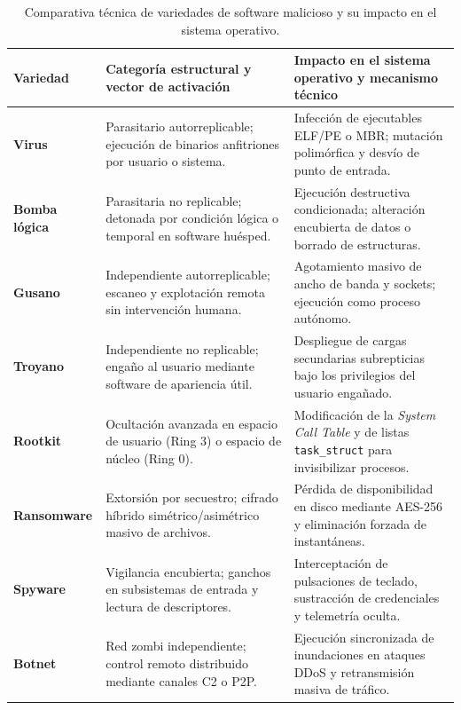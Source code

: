 \documentclass[12pt]{article}
\begin{document}
\begin{table}[!htbp]
\centering
\scriptsize
\renewcommand{\arraystretch}{1.05}
\renewcommand{\tabularxcolumn}[1]{m{#1}}
\setlength{\emergencystretch}{1.5em}
\caption{Comparativa técnica de variedades de software malicioso y su impacto en el sistema operativo.}
\label{tab:comparativaVariedadesMalware}
\begin{tabularx}{\textwidth}{>{\centering\arraybackslash}m{2.2cm} X X}
\toprule
\textbf{Variedad} & \textbf{Categoría estructural y vector de activación} & \textbf{Impacto en el sistema operativo y mecanismo técnico} \\
\midrule
\textbf{Virus} & Parasitario autorreplicable; ejecución de binarios anfitriones por usuario o sistema. & Infección de ejecutables ELF/PE o MBR; mutación polimórfica y desvío de punto de entrada. \\
\addlinespace
\textbf{Bomba lógica} & Parasitaria no replicable; detonada por condición lógica o temporal en software huésped. & Ejecución destructiva condicionada; alteración encubierta de datos o borrado de estructuras. \\
\addlinespace
\textbf{Gusano} & Independiente autorreplicable; escaneo y explotación remota sin intervención humana. & Agotamiento masivo de ancho de banda y sockets; ejecución como proceso autónomo. \\
\addlinespace
\textbf{Troyano} & Independiente no replicable; engaño al usuario mediante software de apariencia útil. & Despliegue de cargas secundarias subrepticias bajo los privilegios del usuario engañado. \\
\addlinespace
\textbf{Rootkit} & Ocultación avanzada en espacio de usuario (Ring 3) o espacio de núcleo (Ring 0). & Modificación de la \textit{System Call Table} y de listas \texttt{task\_struct} para invisibilizar procesos. \\
\addlinespace
\textbf{Ransomware} & Extorsión por secuestro; cifrado híbrido simétrico/asimétrico masivo de archivos. & Pérdida de disponibilidad en disco mediante AES-256 y eliminación forzada de instantáneas. \\
\addlinespace
\textbf{Spyware} & Vigilancia encubierta; ganchos en subsistemas de entrada y lectura de descriptores. & Interceptación de pulsaciones de teclado, sustracción de credenciales y telemetría oculta. \\
\addlinespace
\textbf{Botnet} & Red zombi independiente; control remoto distribuido mediante canales C2 o P2P. & Ejecución sincronizada de inundaciones en ataques DDoS y retransmisión masiva de tráfico. \\
\bottomrule
\end{tabularx}
\end{table}
\end{document}
